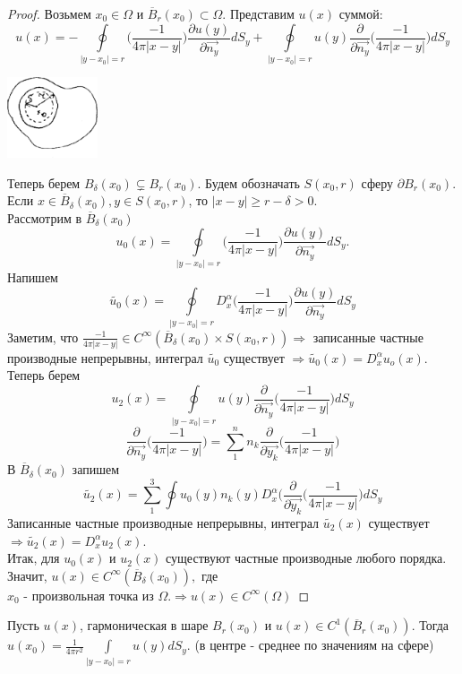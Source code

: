 \begin{proof}
Возьмем $x_0 \in \Omega$ и $\overline{B}_r(x_0) \subset \Omega$. Представим $u(x)$ суммой: $$u(x)= - \oint\limits_{|y-x_0|=r} \bigg( \frac{-1}{4\pi |x-y|} \bigg) \frac{\partial u(y)}{\partial \vec{n_y}} dS_y + \oint\limits_{|y-x_0|=r} u(y) \frac{\partial}{\partial \vec{n_y}} \bigg(\frac{-1}{4\pi |x-y|}\bigg) dS_y $$
\begin{center}
\includegraphics[width=0.2\textwidth]{17_2_new}
\end{center}
Теперь берем $B_{\delta}(x_0) \subsetneq B_{r}(x_0).$ Будем обозначать $S(x_0,r)$ сферу $\partial B_r(x_0).$ Если $x \in \overline{B}_{\delta}(x_0), y \in S(x_0,r)$, то $|x-y| \geq r - \delta > 0.$\\
Рассмотрим в $\overline{B}_{\delta}(x_0)$ $$u_0(x)= \oint\limits_{|y-x_0|=r} \bigg( \frac{-1}{4\pi |x-y|} \bigg) \frac{\partial u(y)}{\partial \vec{n_y}} dS_y.$$
Напишем $$\tilde{u_0}(x) = \oint\limits_{|y-x_0|=r} D_x^\alpha \bigg( \frac{-1}{4\pi |x-y|} \bigg) \frac{\partial u(y)}{\partial \vec{n_y}} dS_y$$
Заметим, что $\frac{-1}{4\pi |x-y|} \in C^{\infty}( \overline{B}_{\delta}(x_0) \times S(x_0,r)) \Rightarrow$ записанные частные производные непрерывны, интеграл $\tilde{u_0}$ существует $\Rightarrow \tilde{u_0}(x) = D_x^\alpha u_o(x).$\\
Теперь берем $$u_2(x) = \oint\limits_{|y-x_0|=r} u(y) \frac{\partial}{\partial \vec{n_y}} \bigg(\frac{-1}{4\pi |x-y|}\bigg) dS_y$$ 
$$\frac{\partial}{\partial \vec{n_y}} \bigg(\frac{-1}{4\pi |x-y|}\bigg) = \sum_1^n n_k \frac{\partial}{\partial \vec{y_k}} \bigg(\frac{-1}{4\pi |x-y|}\bigg)$$ В $\overline{B}_{\delta}(x_0)$ запишем 
$$\tilde{u_2}(x)=\sum_1^3 \oint u_0(y) n_k (y) D_x^\alpha \bigg(\frac{\partial}{\partial \vec{y_k}} \bigg(\frac{-1}{4\pi |x-y|}\bigg)dS_y$$
Записанные частные производные непрерывны, интеграл $\tilde{u_2}(x)$ существует $\Rightarrow \tilde{u_2}(x)=D_x^\alpha u_2(x).$\\
Итак, для $u_0(x)$ и $u_2(x)$ существуют частные производные любого порядка. Значит, $u(x) \in  C^{\infty}( \overline{B}_{\delta}(x_0)),$ где\\ $x_0$ - произвольная точка из $\Omega. \Rightarrow u(x) \in C^{\infty}(\Omega)$
\end{proof}
\begin{theorem}
Пусть $u(x)$, гармоническая в шаре $B_r(x_0)$ и $u(x) \in C^1(\overline{B}_r(x_0))$. Тогда $u(x_0)= \frac{1}{4\pi r^2} \int \limits_{|y-x_0|=r}u(y)dS_y.$ (в центре - среднее по значениям на сфере)
\end{theorem}
